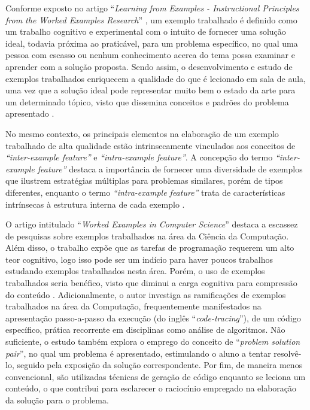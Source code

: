 Conforme exposto no artigo ``\textit{Learning from Examples - Instructional Principles from the Worked Examples Research}'' \cite{Robert.Atkinson-etal:2000}, um exemplo trabalhado é definido como um trabalho cognitivo e experimental com o intuito de fornecer uma solução ideal, todavia próxima ao praticável, para um problema específico, no qual uma pessoa com escasso ou nenhum conhecimento acerca do tema possa examinar e aprender com a solução proposta. Sendo assim, o desenvolvimento e estudo de exemplos trabalhados enriquecem a qualidade do que é lecionado em sala de aula, uma vez que a solução ideal pode representar muito bem o estado da arte para um determinado tópico, visto que dissemina conceitos e padrões do problema apresentado \cite{Robert.Atkinson-etal:2000}.

No mesmo contexto, os principais elementos na elaboração de um exemplo trabalhado de alta qualidade estão intrinsecamente vinculados aos conceitos de \textit{``inter-example feature''} e \textit{``intra-example feature''}. A concepção do termo \textit{``inter-example feature''} destaca a importância de fornecer uma diversidade de exemplos que ilustrem estratégias múltiplas para problemas similares, porém de tipos diferentes, enquanto o termo \textit{``intra-example feature''} trata de características intrínsecas à estrutura interna de cada exemplo \cite{Robert.Atkinson-etal:2000}. 

O artigo intitulado ``\textit{Worked Examples in Computer Science}'' \cite{Skudder-LuxtonReilly:2014} destaca a escassez de pesquisas sobre exemplos trabalhados na área da Ciência da Computação. Além disso, o trabalho expõe que as tarefas de programação requerem um alto teor cognitivo, logo isso pode ser um indício para haver poucos trabalhos estudando exemplos trabalhados nesta área. Porém, o uso de exemplos trabalhados seria benéfico, visto que diminui a carga cognitiva para compressão do conteúdo \cite{Robert.Atkinson-etal:2000}. Adicionalmente, o autor investiga as ramificações de exemplos trabalhados na área da Computação, frequentemente manifestados na apresentação passo-a-passo da execução (do inglês ``\textit{code-tracing}''), de um código específico, prática recorrente em disciplinas como análise de algoritmos. Não suficiente, o estudo também explora o emprego do conceito de ``\textit{problem solution pair}'', no qual um problema é apresentado, estimulando o aluno a tentar resolvê-lo, seguido pela exposição da solução correspondente. Por fim, de maneira menos convencional, são utilizadas técnicas de geração de código enquanto se leciona um conteúdo, o que contribui para esclarecer o raciocínio empregado na elaboração da solução para o problema.

